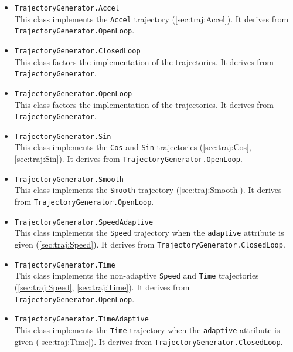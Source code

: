 \begin{itemize}
\item \lstinline|TrajectoryGenerator.Accel|~\\
  This class implements the \lstinline|Accel| trajectory
  (\autoref{sec:traj:Accel}).  It derives from
  \lstinline|TrajectoryGenerator.OpenLoop|.

\item \lstinline|TrajectoryGenerator.ClosedLoop|~\\
  This class factors the implementation of the 
  trajectories.  It derives from \lstinline|TrajectoryGenerator|.

\item \lstinline|TrajectoryGenerator.OpenLoop|~\\
  This class factors the implementation of the 
  trajectories.  It derives from \lstinline|TrajectoryGenerator|.

\item \lstinline|TrajectoryGenerator.Sin|~\\
  This class implements the \lstinline|Cos| and \lstinline|Sin|
  trajectories (\autoref{sec:traj:Cos}, \autoref{sec:traj:Sin}).  It
  derives from \lstinline|TrajectoryGenerator.OpenLoop|.

\item \lstinline|TrajectoryGenerator.Smooth|~\\
  This class implements the \lstinline|Smooth| trajectory
  (\autoref{sec:traj:Smooth}).  It derives from
  \lstinline|TrajectoryGenerator.OpenLoop|.

\item \lstinline|TrajectoryGenerator.SpeedAdaptive|~\\
  This class implements the \lstinline|Speed| trajectory when the
  \lstinline|adaptive| attribute is given (\autoref{sec:traj:Speed}).
  It derives from \lstinline|TrajectoryGenerator.ClosedLoop|.

\item \lstinline|TrajectoryGenerator.Time|~\\
  This class implements the non-adaptive \lstinline|Speed| and
  \lstinline|Time| trajectories (\autoref{sec:traj:Speed},
  \autoref{sec:traj:Time}).  It derives from
  \lstinline|TrajectoryGenerator.OpenLoop|.

\item \lstinline|TrajectoryGenerator.TimeAdaptive|~\\
  This class implements the \lstinline|Time| trajectory when the
  \lstinline|adaptive| attribute is given (\autoref{sec:traj:Time}).
  It derives from \lstinline|TrajectoryGenerator.ClosedLoop|.
\end{itemize}

